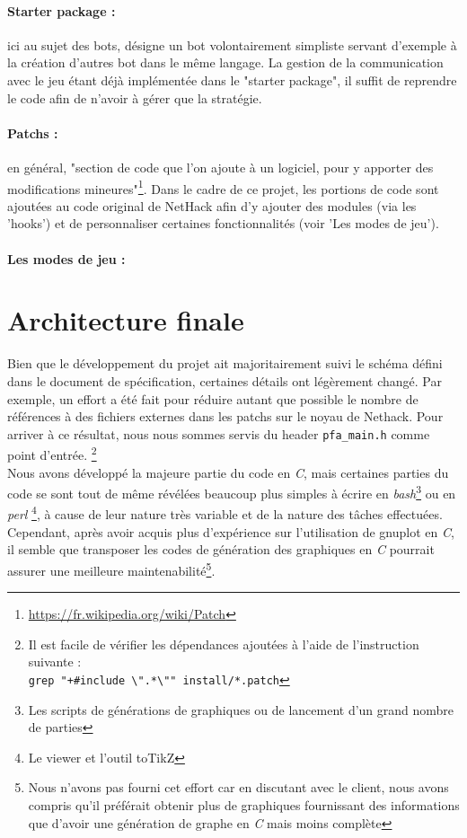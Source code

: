 \documentclass[a4paper,12pt]{article}
\begin{document}
\paragraph{Starter package :}ici au sujet des bots, désigne un bot volontairement
simpliste servant d'exemple à la création d'autres bot dans le même langage.
La gestion de la communication avec le jeu étant déjà implémentée dans le
"starter package", il suffit de reprendre le code afin de n'avoir à gérer que
la stratégie.

\paragraph{Patchs :}en général, "section de code que l'on ajoute à un
logiciel, pour y apporter des modifications
mineures"\footnote{\url{https://fr.wikipedia.org/wiki/Patch}}. Dans le cadre
de ce projet, les portions de code sont ajoutées au code original de NetHack
afin d'y ajouter des modules (via les 'hooks') et de personnaliser certaines
fonctionnalités (voir 'Les modes de jeu').

\paragraph{Les modes de jeu :} 


\section{Architecture finale}

Bien que le développement du projet ait majoritairement suivi le schéma
défini dans le document de spécification, certaines détails ont légèrement
changé. Par exemple, un effort a été fait pour réduire autant que possible
le nombre de références à des fichiers externes dans les patchs sur le noyau
de Nethack. Pour arriver à ce résultat, nous nous sommes servis du header
{\verb|pfa_main.h|} comme point d'entrée.
\footnote{Il est facile de vérifier les dépendances ajoutées à l'aide de
  l'instruction suivante :\\
{\verb*|grep "+#include \".*\"" install/*.patch|}}
\\
Nous avons développé la majeure partie du code en {\em C}, mais certaines
parties du code se sont tout de même révélées beaucoup plus simples à
écrire en {\em bash}\footnote{Les scripts de générations de graphiques ou de
  lancement d'un grand nombre de parties} ou en {\em perl}
\footnote{Le viewer et l'outil toTikZ}, à cause de leur nature très variable
et de la nature des tâches effectuées. Cependant, après avoir acquis plus
d'expérience sur l'utilisation de gnuplot en {\em C}, il semble que transposer
les codes de génération des graphiques en {\em C} pourrait assurer une
meilleure maintenabilité\footnote{Nous n'avons pas fourni cet effort car en
discutant avec le client, nous avons compris qu'il préférait obtenir plus de
graphiques fournissant des informations que d'avoir une génération de graphe
en {\em C} mais moins complète}.
\end{document}
